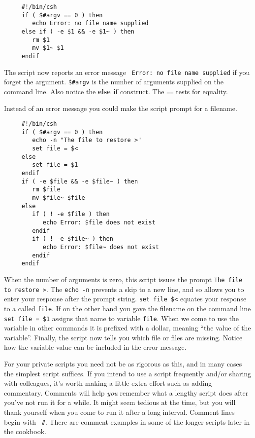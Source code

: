 \small
\begin{verbatim}
     #!/bin/csh
     if ( $#argv == 0 ) then
        echo Error: no file name supplied
     else if ( -e $1 && -e $1~ ) then
        rm $1
        mv $1~ $1
     endif
\end{verbatim}
\normalsize
The script now reports an error message ~\mbox{{\tt Error:~no file name
supplied}} if you forget the argument.  {\tt \$\#argv} is the number of
arguments supplied on the command line.  Also notice the {\bf else if}
construct.  The {\tt ==} tests for equality.

Instead of an error message you could make the script prompt for a
filename.

\small
\begin{verbatim}
     #!/bin/csh
     if ( $#argv == 0 ) then
        echo -n "The file to restore >"
        set file = $<
     else
        set file = $1
     endif
     if ( -e $file && -e $file~ ) then
        rm $file
        mv $file~ $file
     else 
        if ( ! -e $file ) then
           echo Error: $file does not exist
        endif
        if ( ! -e $file~ ) then
           echo Error: $file~ does not exist
        endif
     endif
\end{verbatim}
\normalsize

When the number of arguments is zero, this script issues the prompt
{\tt The file to restore >}.  The {\tt echo -n} prevents a skip to a
new line, and so allows you to enter your response after the prompt
string.  {\tt set file \$<} equates your response to a  called {\tt file}.  If on the other hand you gave the
filename on the command line {\tt set file = \$1} assigns that name to
variable {\tt file}.  When we come to use the variable in other commands
it is prefixed with a dollar, meaning ``the value of the variable''.
Finally, the script now tells you which file or files are missing.
Notice how the variable value can be included in the error message.

For your private scripts you need not be as rigorous as this, and in
many cases the simplest script suffices.  If you intend to use a script
frequently and/or sharing with colleagues, it's worth making a little
extra effort such as adding commentary.  Comments will help {\em you\/}
remember what a lengthy script does after you've not run it for a while.
It might seem tedious at the time, but you will thank yourself when you
come to run it after a long interval.  Comment lines begin with {\tt
\#}.  There are comment examples in some of the longer scripts later in
the cookbook.

